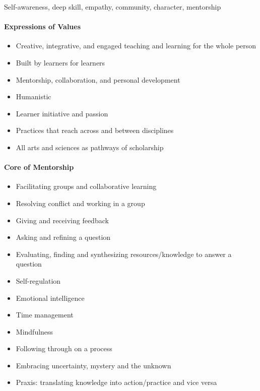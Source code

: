 \documentclass[letterpaper,10pt,headsepline]{scrreprt}
\begin{document}
Self-awareness, deep skill, empathy, community, character, mentorship

\paragraph{Expressions of Values}

\begin{itemize}
\itemsep1pt\parskip0pt
\item
  Creative, integrative, and engaged teaching and learning for the whole
  person
\item
  Built by learners for learners
\item
  Mentorship, collaboration, and personal development
\item
  Humanistic
\item
  Learner initiative and passion
\item
  Practices that reach across and between disciplines
\item
  All arts and sciences as pathways of scholarship
\end{itemize}

\paragraph{Core of Mentorship}

\begin{itemize}
\itemsep1pt\parskip0pt
\item
  Facilitating groups and collaborative learning
\item
  Resolving conflict and working in a group
\item
  Giving and receiving feedback
\item
  Asking and refining a question
\item
  Evaluating, finding and synthesizing resources/knowledge to answer a
  question
\item
  Self-regulation
\item
  Emotional intelligence
\item
  Time management
\item
  Mindfulness
\item
  Following through on a process
\item
  Embracing uncertainty, mystery and the unknown
\item
  Praxis: translating knowledge into action/practice and vice versa
\end{itemize}
\end{document}
